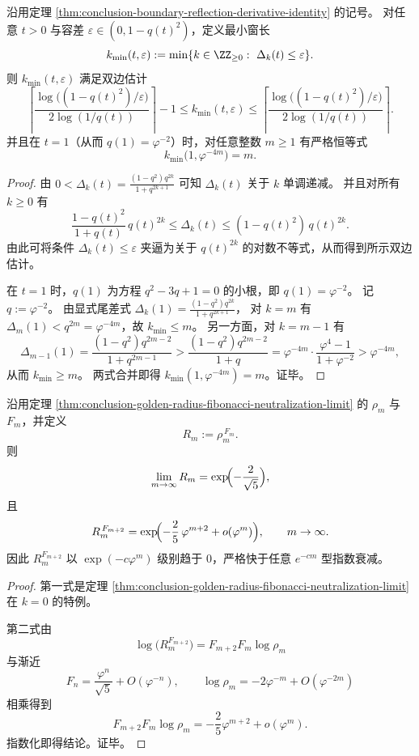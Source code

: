 \begin{corollary}[黄金点的最小窗长取整律]\label{cor:conclusion-boundary-reflection-min-window-length-integer-lock}
沿用定理 \ref{thm:conclusion-boundary-reflection-derivative-identity} 的记号。
对任意 \(t>0\) 与容差 \(\varepsilon\in(0,1-q(t)^2)\)，定义最小窗长
\[
k_{\min}(t,\varepsilon):=\min\{k\in\ZZ_{\ge 0}:\ \Delta_k(t)\le \varepsilon\}.
\]
则 \(k_{\min}(t,\varepsilon)\) 满足双边估计
\[
\left\lceil\frac{\log\!\bigl((1-q(t)^2)/\varepsilon\bigr)}{2\log(1/q(t))}\right\rceil-1
\le
k_{\min}(t,\varepsilon)
\le
\left\lceil\frac{\log\!\bigl((1-q(t)^2)/\varepsilon\bigr)}{2\log(1/q(t))}\right\rceil.
\]
并且在 \(t=1\)（从而 \(q(1)=\varphi^{-2}\)）时，对任意整数 \(m\ge 1\) 有严格恒等式
\[
k_{\min}\bigl(1,\varphi^{-4m}\bigr)=m.
\]
\end{corollary}
\begin{proof}
由
\(
0<\Delta_k(t)=\frac{(1-q^2)q^{2k}}{1+q^{2k+1}}
\)
可知 \(\Delta_k(t)\) 关于 \(k\) 单调递减。
并且对所有 \(k\ge 0\) 有
\[
\frac{1-q(t)^2}{1+q(t)}\,q(t)^{2k}\le \Delta_k(t)\le (1-q(t)^2)\,q(t)^{2k}.
\]
由此可将条件 \(\Delta_k(t)\le \varepsilon\) 夹逼为关于 \(q(t)^{2k}\) 的对数不等式，从而得到所示双边估计。

在 \(t=1\) 时，\(q(1)\) 为方程 \(q^2-3q+1=0\) 的小根，即 \(q(1)=\varphi^{-2}\)。
记 \(q:=\varphi^{-2}\)。
由显式尾差式
\(
\Delta_k(1)=\frac{(1-q^2)q^{2k}}{1+q^{2k+1}}
\)，
对 \(k=m\) 有 \(\Delta_m(1)<q^{2m}=\varphi^{-4m}\)，故 \(k_{\min}\le m\)。
另一方面，对 \(k=m-1\) 有
\[
\Delta_{m-1}(1)
=\frac{(1-q^2)q^{2m-2}}{1+q^{2m-1}}
>
\frac{(1-q^2)q^{2m-2}}{1+q}
=\varphi^{-4m}\cdot\frac{\varphi^{4}-1}{1+\varphi^{-2}}
>\varphi^{-4m},
\]
从而 \(k_{\min}\ge m\)。
两式合并即得 \(k_{\min}(1,\varphi^{-4m})=m\)。证毕。
\end{proof}

\begin{theorem}\label{thm:conclusion-golden-fibonacci-mixed-power-superexponential}
沿用定理 \ref{thm:conclusion-golden-radius-fibonacci-neutralization-limit} 的 \(\rho_m\) 与 \(F_m\)，并定义
\[
R_m:=\rho_m^{\,F_m}.
\]
则
\[
\lim_{m\to\infty}R_m=\exp\!\Bigl(-\frac{2}{\sqrt5}\Bigr),
\]
且
\[
R_m^{\,F_{m+2}}
=
\exp\!\Bigl(-\frac{2}{5}\,\varphi^{m+2}+o(\varphi^m)\Bigr),
\qquad m\to\infty.
\]
因此 \(R_m^{F_{m+2}}\) 以 \(\exp(-c\varphi^m)\) 级别趋于 \(0\)，严格快于任意 \(e^{-cm}\) 型指数衰减。
\end{theorem}
\begin{proof}
第一式是定理 \ref{thm:conclusion-golden-radius-fibonacci-neutralization-limit} 在 \(k=0\) 的特例。

第二式由
\[
\log\!\bigl(R_m^{F_{m+2}}\bigr)=F_{m+2}F_m\log\rho_m
\]
与渐近
\[
F_n=\frac{\varphi^n}{\sqrt5}+O(\varphi^{-n}),
\qquad
\log\rho_m=-2\varphi^{-m}+O(\varphi^{-2m})
\]
相乘得到
\[
F_{m+2}F_m\log\rho_m
=-\frac{2}{5}\varphi^{m+2}+o(\varphi^m).
\]
指数化即得结论。证毕。
\end{proof}

